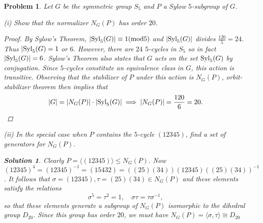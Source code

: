 \documentclass[11pt]{article}
\newcommand{\1}{\textbf{1}}
\newtheorem{prob}{Problem}
\newtheorem*{sol*}{\textit{Solution}}
\begin{document}
\begin{prob}
Let $G$ be the symmetric group $S_5$ and $P$ a Sylow $5$-subgroup of $G$. 

\noindent (i) Show that the normalizer $N_G(P)$ has order $20$. 

\begin{proof}
By Sylow's Theorem, $|\textnormal{Syl}_5(G)| \equiv 1(\textnormal{mod}5)$ and $|\textnormal{Syl}_5(G)|$ divides $\frac{120}{5} = 24$. Thus $|\textnormal{Syl}_5(G) =  1$ or $6$. However, there are $24$  $5$-cycles in $S_5$ so in fact $|\textnormal{Syl}_5(G)| = 6$. Sylow's Theorem also states that $G$ acts on the set $\textnormal{Syl}_5(G)$ by conjugation. Since $5$-cycles constitute an equivalence class in $G$, this action is transitive. Observing that the stabilizer of $P$ under this action is $N_G(P)$, orbit-stabilizer theorem then implies that \[|G| = |N_G(P)|\cdot | \textnormal{Syl}_5(G)| \implies |N_G(P)| = \frac{120}{6} = 20.\] 
\end{proof}

\noindent (ii) In the special case when $P$ contains the $5$-cycle $(12345)$, find a set of generators for $N_G(P)$. 

\begin{sol*}
\textnormal{Clearly $P = \langle (12345)\rangle\leq N_G(P)$. Now  $(12345)^4 = (12345)^{-1} = (15432) = ((25)(34))(12345)((25)(34))^{-1}$. It follows that $\sigma = (12345),\tau = (25)(34)\in N_G(P)$ and these elements satisfy the relations \[\sigma^5 = \tau^2 = 1,\quad  \sigma\tau = \tau\sigma^{-1},\] so that these elements generate a subgroup of $N_G(P)$ isomorphic to the dihedral group $D_{20}$. Since this group has order $20$, we must have $N_G(P) = \langle\sigma,\tau\rangle \cong D_{20}$ 
}
\end{sol*}
\end{prob}
\end{document}
